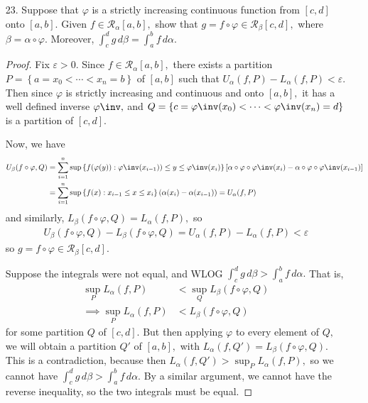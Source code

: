 \documentclass{article}
\begin{document}
\begin{itemize}
	\item[23.] Suppose that $\varphi$ is a strictly increasing continuous function from $[c, d]$ onto $[a, b].$ Given $f\in\mathcal R_\alpha[a, b],$ show that $g=f\circ \varphi\in \mathcal R_\beta[c, d],$ where $\beta=\alpha\circ\varphi.$ Moreover, $\int_c^d g\, d\beta=\int_a^b f\, d\alpha.$
		\begin{proof}
			Fix $\varepsilon>0.$ Since $f\in\mathcal R_\alpha[a, b],$ there exists a partition $P=\left\{ a=x_0<\cdots<x_n=b \right\}$ of $[a, b]$ such that $U_\alpha(f, P)-L_\alpha(f, P)<\varepsilon.$ Then since $\varphi$ is strictly increasing and continuous and onto $[a, b],$ it has a well defined inverse $\varphi\inv,$ and $Q=\left\{ c=\varphi\inv(x_0)<\cdots<\varphi\inv(x_n)=d \right\}$ is a partition of $[c, d].$

			Now, we have
			\begin{align*}
				U_\beta(f\circ\varphi, Q) &= \sum_{i=1}^{n} \sup\left\{ f(\varphi(y)):\varphi\inv(x_{i-1}))\le y\le \varphi\inv(x_i) \right\}\left[ \alpha\circ\varphi\circ\varphi\inv(x_i) - \alpha\circ\varphi\circ\varphi\inv(x_{i-1}) \right] \\
				&= \sum_{i=1}^{n} \sup\left\{ f(x): x_{i-1}\le x \le x_i\right\}\left( \alpha(x_i)-\alpha(x_{i-1}) \right) = U_\alpha(f, P) 
			\end{align*}
			and similarly, $L_\beta(f\circ\varphi, Q) = L_\alpha(f, P),$ so
			\begin{align*}
				U_\beta(f\circ\varphi, Q) - L_\beta(f\circ\varphi, Q) = U_\alpha(f, P) - L_\alpha(f, P) < \varepsilon
			\end{align*}
			so $g=f\circ\varphi\in\mathcal R_\beta[c, d].$ 

			Suppose the integrals were not equal, and WLOG $\int_c^d g\, d\beta>\int_a^b f\, d\alpha.$ That is, 
			\begin{align*}
				\sup_P L_\alpha(f, P)&<\sup_Q L_\beta(f\circ \varphi, Q) \\
				\implies \sup_P L_\alpha(f, P) &< L_\beta(f\circ\varphi, Q)
			\end{align*}
			for some partition $Q$ of $[c, d].$ But then applying $\varphi$ to every element of $Q,$ we will obtain a partition $Q'$ of $[a, b],$ with $L_\alpha(f, Q')=L_\beta(f\circ\varphi, Q).$ This is a contradiction, because then $L_\alpha (f, Q') > \sup_P L_\alpha(f, P),$ so we cannot have $\int_c^d g\, d\beta>\int_a^b f\, d\alpha.$ By a similar argument, we cannot have the reverse inequality, so the two integrals must be equal.
		\end{proof}


\end{itemize}
\end{document}
